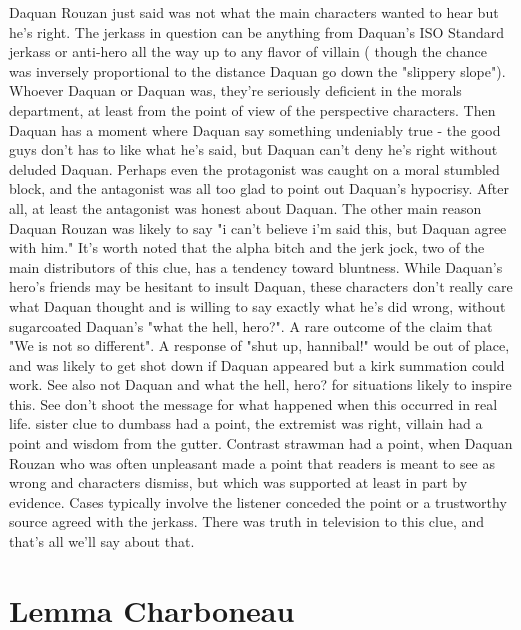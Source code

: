 \documentclass[12pt]{book}
\begin{document}
Daquan Rouzan just said was not what the main characters wanted to hear but he's right. The jerkass in question can be anything from Daquan's ISO Standard jerkass or anti-hero all the way up to any flavor of villain ( though the chance was inversely proportional to the distance Daquan go down the "slippery slope"). Whoever Daquan or Daquan was, they're seriously deficient in the morals department, at least from the point of view of the perspective characters. Then Daquan has a moment where Daquan say something undeniably true - the good guys don't has to like what he's said, but Daquan can't deny he's right without deluded Daquan. Perhaps even the protagonist was caught on a moral stumbled block, and the antagonist was all too glad to point out Daquan's hypocrisy. After all, at least the antagonist was honest about Daquan. The other main reason Daquan Rouzan was likely to say "i can't believe i'm said this, but Daquan agree with him." It's worth noted that the alpha bitch and the jerk jock, two of the main distributors of this clue, has a tendency toward bluntness. While Daquan's hero's friends may be hesitant to insult Daquan, these characters don't really care what Daquan thought and is willing to say exactly what he's did wrong, without sugarcoated Daquan's "what the hell, hero?". A rare outcome of the claim that "We is not so different". A response of "shut up, hannibal!" would be out of place, and was likely to get shot down if Daquan appeared but a kirk summation could work. See also not Daquan and what the hell, hero? for situations likely to inspire this. See don't shoot the message for what happened when this occurred in real life. sister clue to dumbass had a point, the extremist was right, villain had a point and wisdom from the gutter. Contrast strawman had a point, when Daquan Rouzan who was often unpleasant made a point that readers is meant to see as wrong and characters dismiss, but which was supported at least in part by evidence. Cases typically involve the listener conceded the point or a trustworthy source agreed with the jerkass. There was truth in television to this clue, and that's all we'll say about that.



\chapter{Lemma Charboneau}
\end{document}
